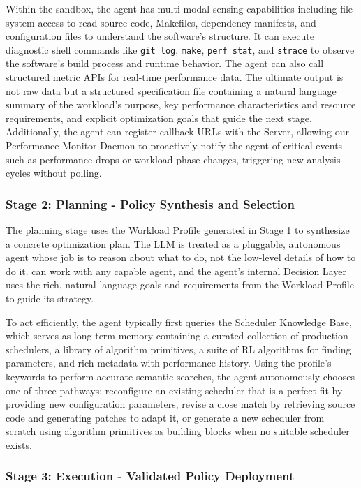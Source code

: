 Within the sandbox, the agent has multi-modal sensing capabilities including file system access to read source code, Makefiles, dependency manifests, and configuration files to understand the software's structure. It can execute diagnostic shell commands like \texttt{git log}, \texttt{make}, \texttt{perf stat}, and \texttt{strace} to observe the software's build process and runtime behavior. The agent can also call structured metric APIs for real-time performance data. The ultimate output is not raw data but a structured specification file containing a natural language summary of the workload's purpose, key performance characteristics and resource requirements, and explicit optimization goals that guide the next stage. Additionally, the agent can register callback URLs with the \sys Server, allowing our Performance Monitor Daemon to proactively notify the agent of critical events such as performance drops or workload phase changes, triggering new analysis cycles without polling.

\subsubsection{Stage 2: Planning - Policy Synthesis and Selection}

The planning stage uses the Workload Profile generated in Stage 1 to synthesize a concrete optimization plan. The LLM is treated as a pluggable, autonomous agent whose job is to reason about what to do, not the low-level details of how to do it. \sys can work with any capable agent, and the agent's internal Decision Layer uses the rich, natural language goals and requirements from the Workload Profile to guide its strategy.

To act efficiently, the agent typically first queries the Scheduler Knowledge Base, which serves as long-term memory containing a curated collection of production schedulers, a library of algorithm primitives, a suite of RL algorithms for finding parameters, and rich metadata with performance history. Using the profile's keywords to perform accurate semantic searches, the agent autonomously chooses one of three pathways: reconfigure an existing scheduler that is a perfect fit by providing new configuration parameters, revise a close match by retrieving source code and generating patches to adapt it, or generate a new scheduler from scratch using algorithm primitives as building blocks when no suitable scheduler exists.

\subsubsection{Stage 3: Execution - Validated Policy Deployment}

